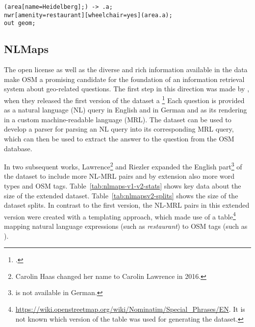 \begin{lstlisting}[style=MyOverpassQL,title={Overpass QL for wheelchair-accessible restaurants in Heidelberg}]
(area[name=Heidelberg];) -> .a;
nwr[amenity=restaurant][wheelchair=yes](area.a);
out geom;
\end{lstlisting}

\subsection{NLMaps}
\label{sec:nlmaps}

The open license as well as the diverse and rich information available in the
data make OSM a promising candidate for the foundation of an information
retrieval system about geo-related questions. The first step in this direction
was made by \textcite{haas-2016}, when they released the first version of the
\nlmaps{} dataset a \footcite{nlmaps} Each question is provided as a natural language
(NL) query in English and in German and as its rendering in a custom
machine-readable language (MRL). The dataset can be used to develop a parser for
parsing an NL query into its corresponding MRL query, which can then be used to
extract the answer to the question from the OSM database.

In two subsequent works, Lawrence\footnote{Carolin Haas changed her name to
  Carolin Lawrence in 2016.} and Riezler
\parencites*{lawrence-2016}{lawrence-2018} expanded the English
part\footnote{\nlmapstwo{} is not available in German.} of the dataset to
include more NL-MRL pairs and by extension also more word types and OSM tags.
Table~\ref{tab:nlmaps-v1-v2-stats} shows key data about the size of the extended
dataset. Table~\ref{tab:nlmapsv2-splits} shows the size of the dataset splits.
In contrast to the first version, the NL-MRL pairs in this extended version were
created with a templating approach, which made use of a
table\footnote{\url{https://wiki.openstreetmap.org/wiki/Nominatim/Special_Phrases/EN}.
  It is not known which version of the table was used for generating the
  \nlmapstwo{} dataset.} mapping natural language expressions (such as
\emph{restaurant}) to OSM tags (such as ).

